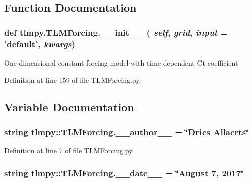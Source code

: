 \subsection{Function Documentation}
\hypertarget{namespacetlmpy_1_1TLMForcing_ab507620d756cd88ed5301345e53c543c}{
\subsubsection[{\_\-\_\-init\_\-\_\-}]{\setlength{\rightskip}{0pt plus 5cm}def tlmpy.TLMForcing.\_\-\_\-init\_\-\_\- ( {\em self}, \/   {\em grid}, \/   {\em input} = {\ttfamily 'default'}, \/   {\em kwargs})}}
\label{namespacetlmpy_1_1TLMForcing_ab507620d756cd88ed5301345e53c543c}
\begin{DoxyVerb}
One-dimensional constant forcing model with time-dependent Ct coefficient
\end{DoxyVerb}
 

Definition at line 159 of file TLMForcing.py.

\subsection{Variable Documentation}
\hypertarget{namespacetlmpy_1_1TLMForcing_ad2789c7bfa2d6a6fd9f7543f4e46fb43}{
\subsubsection[{\_\-\_\-author\_\-\_\-}]{\setlength{\rightskip}{0pt plus 5cm}string {\bf tlmpy::TLMForcing.\_\-\_\-author\_\-\_\-} = \char`\"{}Dries Allaerts\char`\"{}}}
\label{namespacetlmpy_1_1TLMForcing_ad2789c7bfa2d6a6fd9f7543f4e46fb43}


Definition at line 7 of file TLMForcing.py.\hypertarget{namespacetlmpy_1_1TLMForcing_a4909953e978b5878903d59fa0b437e11}{
\subsubsection[{\_\-\_\-date\_\-\_\-}]{\setlength{\rightskip}{0pt plus 5cm}string {\bf tlmpy::TLMForcing.\_\-\_\-date\_\-\_\-} = \char`\"{}August 7, 2017\char`\"{}}}
\label{namespacetlmpy_1_1TLMForcing_a4909953e978b5878903d59fa0b437e11}


